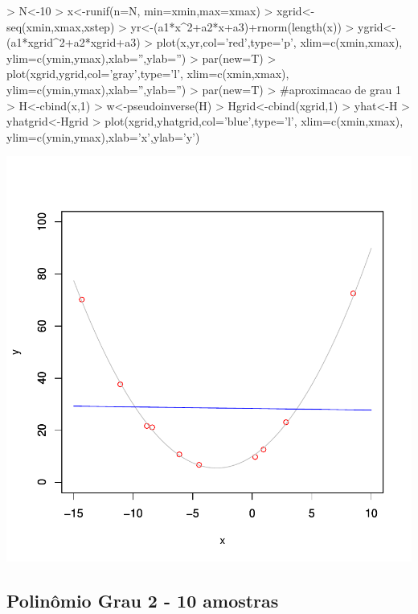 \documentclass{article}
\begin{document}
\begin{Schunk}
\begin{Sinput}
>   N<-10
>   x<-runif(n=N, min=xmin,max=xmax)
>   xgrid<-seq(xmin,xmax,xstep)
>   yr<-(a1*x^2+a2*x+a3)+rnorm(length(x))
>   ygrid<-(a1*xgrid^2+a2*xgrid+a3)
>   plot(x,yr,col='red',type='p', xlim=c(xmin,xmax), ylim=c(ymin,ymax),xlab='',ylab='')
>   par(new=T)
>   plot(xgrid,ygrid,col='gray',type='l', xlim=c(xmin,xmax), ylim=c(ymin,ymax),xlab='',ylab='')
>   par(new=T)
>   #aproximacao de grau 1
>   H<-cbind(x,1)
>   w<-pseudoinverse(H) %
>   Hgrid<-cbind(xgrid,1)
>   yhat<-H%
>   yhatgrid<-Hgrid%
>   plot(xgrid,yhatgrid,col='blue',type='l', xlim=c(xmin,xmax), ylim=c(ymin,ymax),xlab='x',ylab='y')
\end{Sinput}
\end{Schunk}
\includegraphics{aproximacao_polinomial-002}

\newpage
\subsection{Polinômio Grau 2 - 10 amostras}
\end{document}

